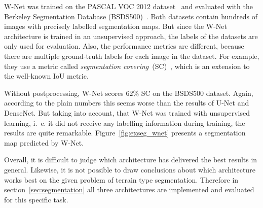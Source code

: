 W-Net was trained on the PASCAL VOC 2012 dataset~\cite{pascal_voc12} and evaluated with the Berkeley Segmentation Database (BSDS500)~\cite{hierarchy_imgseg11}. Both datasets contain hundreds of images with precisely labelled segmentation maps. But since the W-Net architecture is trained in an unsupervised approach, the labels of the datasets are only used for evaluation. Also, the performance metrics are different, because there are multiple ground-truth labels for each image in the dataset. For example, they use a metric called \emph{segmentation covering}~(SC)~\cite{hierarchy_imgseg11}, which is an extension to the well-known IoU metric.

Without postprocessing, W-Net scores $62\%$ SC on the BSDS500 dataset. Again, according to the plain numbers this seems worse than the results of U-Net and DenseNet. But taking into account, that W-Net was trained with unsupervised learning, i.~e. it did not receive any labelling information during training, the results are quite remarkable. Figure~\ref{fig:exseg_wnet} presents a segmentation map predicted by W-Net.

Overall, it is difficult to judge which architecture has delivered the best results in general. Likewise, it is not possible to draw conclusions about which architecture works best on the given problem of terrain type segmentation. Therefore in section~\ref{sec:segmentation} all three architectures are implemented and evaluated for this specific task.

